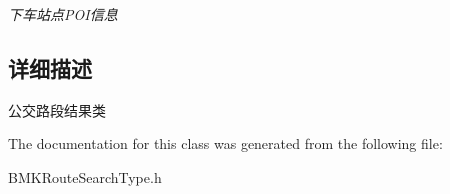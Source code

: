\begin{DoxyCompactItemize}
\begin{DoxyCompactList}\small\item\em 下车站点\-P\-O\-I信息 \end{DoxyCompactList}\end{DoxyCompactItemize}


\subsection{详细描述}
公交路段结果类 

The documentation for this class was generated from the following file\-:\begin{DoxyCompactItemize}
\item 
B\-M\-K\-Route\-Search\-Type.\-h\end{DoxyCompactItemize}
